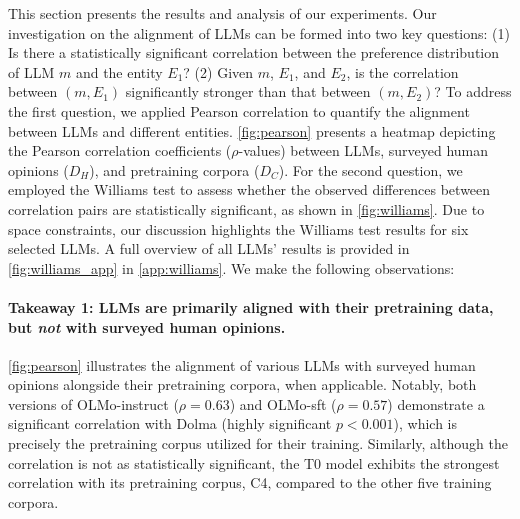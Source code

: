 
This section presents the results and analysis of our experiments. Our investigation on the alignment of LLMs can be formed into two key questions: 
(1) Is there a statistically significant correlation  between the preference distribution of LLM \(m\) and the entity \(E_1\)? (2) Given \(m\), \(E_1\), and \(E_2\), is the correlation between \((m, E_1)\) significantly stronger than that between \((m, E_2)\)?
To address the first question, we applied Pearson correlation to quantify the alignment between LLMs and different entities. \autoref{fig:pearson} presents a heatmap depicting the Pearson correlation coefficients (\(\rho\)-values) between LLMs, surveyed human opinions (\( D_H \)), and pretraining corpora (\( D_C \)). For the second question, we employed the Williams test to assess whether the observed differences between correlation pairs are statistically significant, as shown in \autoref{fig:williams}.
Due to space constraints, our discussion highlights the Williams test results for six selected LLMs. A full overview of all LLMs' results is provided in \autoref{fig:williams_app} in \autoref{app:williams}.
\noindent We make the following observations:





\paragraph{Takeaway 1: LLMs are primarily aligned with their pretraining data, but \textit{not} with surveyed human opinions.
}
\autoref{fig:pearson} illustrates the alignment of various LLMs with surveyed human opinions alongside their pretraining corpora, when applicable. Notably, both versions of OLMo-instruct (\(\rho = 0.63\)) and OLMo-sft (\(\rho = 0.57\)) demonstrate a significant correlation with Dolma (highly significant $p < 0.001$), which is precisely the pretraining corpus utilized for their training. Similarly, although the correlation is not as statistically significant, the T0 model exhibits the strongest correlation with its pretraining corpus, C4, compared to the other five training corpora. 

